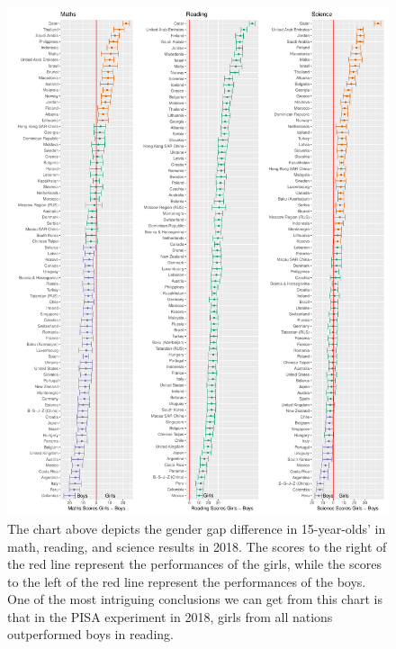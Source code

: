 \begin{Schunk}
\begin{figure}[H]
\includegraphics[width=1\linewidth]{learningtower_files/figure-latex/score-differences-1} \caption[The chart above depicts the gender gap difference in 15-year-olds' in math, reading, and science results in 2018]{The chart above depicts the gender gap difference in 15-year-olds' in math, reading, and science results in 2018. The scores to the right of the red line represent the performances of the girls, while the scores to the left of the red line represent the performances of the boys. One of the most intriguing conclusions we can get from this chart is that in the PISA experiment in 2018, girls from all nations outperformed boys in reading.}\label{fig:score-differences}
\end{figure}
\end{Schunk}

